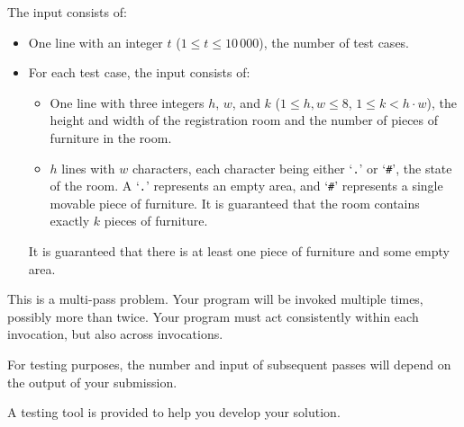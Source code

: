 
    The input consists of:
    \begin{itemize}
        \item One line with an integer $t$ ($1\leq t\leq 10\,000$), the number of test cases.
        \item For each test case, the input consists of:
        \begin{itemize}
        	\item One line with three integers $h$, $w$, and $k$ ($1\leq h,w\leq 8$, $1 \leq k < h \cdot w$),
                the height and width of the registration room and the number of pieces of furniture in the room.
            \item $h$ lines with $w$ characters, each character being either `\texttt{.}' or `\texttt{\#}', the state of the room.
                A `\texttt{.}' represents an empty area, and `\texttt{\#}'
                represents a single movable piece of furniture.
                It is guaranteed that the room
                contains exactly $k$ pieces of furniture.
        \end{itemize}
        It is guaranteed that there is at least one piece of furniture and some empty area.
    \end{itemize}
    This is a multi-pass problem. Your program will be invoked multiple times,
    possibly more than twice.
    Your program must act consistently within each invocation, but also across
    invocations.

    For testing purposes, the number and input of subsequent passes will depend
    on the output of your submission.

    A testing tool is provided to help you develop your solution.
